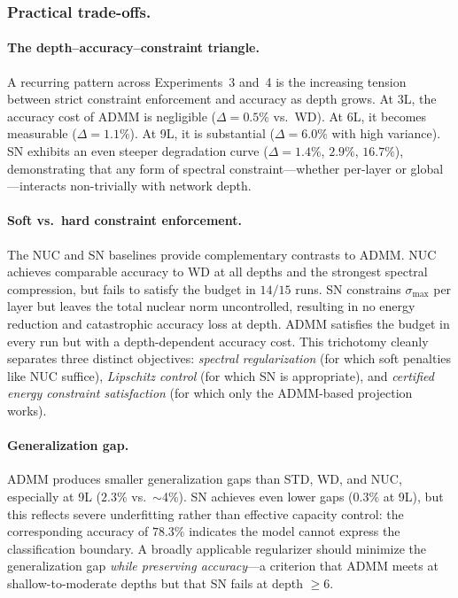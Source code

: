 \documentclass[a4paper,fleqn]{cas-sc}
\theoremstyle{remark}
\theoremstyle{definition}
\begin{document}
\subsubsection{Practical trade-offs.}

\paragraph{The depth--accuracy--constraint triangle.}
A recurring pattern across Experiments~3 and~4 is the increasing tension between strict constraint enforcement and accuracy as depth grows. At 3L, the accuracy cost of ADMM is negligible ($\Delta=0.5\%$ vs.\ WD). At 6L, it becomes measurable ($\Delta=1.1\%$). At 9L, it is substantial ($\Delta=6.0\%$ with high variance). SN exhibits an even steeper degradation curve ($\Delta=1.4\%$, $2.9\%$, $16.7\%$), demonstrating that any form of spectral constraint---whether per-layer or global---interacts non-trivially with network depth.

\paragraph{Soft vs.\ hard constraint enforcement.}
The NUC and SN baselines provide complementary contrasts to ADMM. NUC achieves comparable accuracy to WD at all depths and the strongest spectral compression, but fails to satisfy the budget in $14/15$ runs. SN constrains $\sigma_{\max}$ per layer but leaves the total nuclear norm uncontrolled, resulting in no energy reduction and catastrophic accuracy loss at depth. ADMM satisfies the budget in every run but with a depth-dependent accuracy cost. This trichotomy cleanly separates three distinct objectives: \emph{spectral regularization} (for which soft penalties like NUC suffice), \emph{Lipschitz control} (for which SN is appropriate), and \emph{certified energy constraint satisfaction} (for which only the ADMM-based projection works).

\paragraph{Generalization gap.}
ADMM produces smaller generalization gaps than STD, WD, and NUC, especially at 9L ($2.3\%$ vs.\ $\sim$4\%). SN achieves even lower gaps ($0.3\%$ at 9L), but this reflects severe underfitting rather than effective capacity control: the corresponding accuracy of $78.3\%$ indicates the model cannot express the classification boundary. A broadly applicable regularizer should minimize the generalization gap \emph{while preserving accuracy}---a criterion that ADMM meets at shallow-to-moderate depths but that SN fails at depth $\ge 6$.
\end{document}
